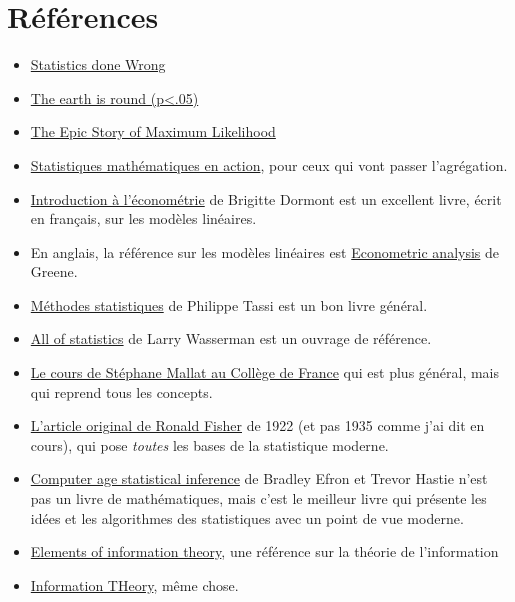 \documentclass[
  10,
  letterpaper,
  DIV=11,
  numbers=noendperiod]{scrreport}
\providecommand{\tightlist}{%
  \setlength{\itemsep}{0pt}\setlength{\parskip}{0pt}}\usepackage{longtable,booktabs,array}
\theoremstyle{plain}
\theoremstyle{definition}
\theoremstyle{plain}
\theoremstyle{definition}
\theoremstyle{definition}
\theoremstyle{plain}
\theoremstyle{remark}
\begin{document}


\hypertarget{ruxe9fuxe9rences}{%
\chapter*{Références}\label{ruxe9fuxe9rences}}


\begin{itemize}
\tightlist
\item
  \href{https://www.statisticsdonewrong.com/}{Statistics done Wrong}
\item
  \href{https://www.sjsu.edu/faculty/gerstman/misc/Cohen1994.pdf}{The
  earth is round (p\textless.05)}
\item
  \href{https://arxiv.org/abs/0804.2996}{The Epic Story of Maximum
  Likelihood}
\item
  \href{https://www.deboecksuperieur.com/ouvrage/9782311007206-statistique-mathematique-en-action}{Statistiques
  mathématiques en action}, pour ceux qui vont passer l'agrégation.
\item
  \href{https://www.eyrolles.com/Entreprise/Livre/introduction-a-l-econometrie-9782707613981/}{Introduction
  à l'économétrie} de Brigitte Dormont est un excellent livre, écrit en
  français, sur les modèles linéaires.
\item
  En anglais, la référence sur les modèles linéaires est
  \href{https://www.pearson.fr/book/?gcoi=27440100285130}{Econometric
  analysis} de Greene.
\item
  \href{https://www.eyrolles.com/Sciences/Livre/methodes-statistiques-9782717848595/}{Méthodes
  statistiques} de Philippe Tassi est un bon livre général.
\item
  \href{https://egrcc.github.io/docs/math/all-of-statistics.pdf}{All of
  statistics} de Larry Wasserman est un ouvrage de référence.
\item
  \href{https://www.college-de-france.fr/fr/agenda/cours/information-et-complexite}{Le
  cours de Stéphane Mallat au Collège de France} qui est plus général,
  mais qui reprend tous les concepts.
\item
  \href{/docs/fisher.pdf}{L'article original de Ronald Fisher} de 1922
  (et pas 1935 comme j'ai dit en cours), qui pose \emph{toutes} les
  bases de la statistique moderne.
\item
  \href{https://hastie.su.domains/CASI_files/PDF/casi.pdf}{Computer age
  statistical inference} de Bradley Efron et Trevor Hastie n'est pas un
  livre de mathématiques, mais c'est le meilleur livre qui présente les
  idées et les algorithmes des statistiques avec un point de vue
  moderne.
\item
  \href{https://onlinelibrary.wiley.com/doi/book/10.1002/047174882X}{Elements
  of information theory}, une référence sur la théorie de l'information
\item
  \href{https://people.lids.mit.edu/yp/homepage/data/itbook-export.pdf}{Information
  THeory}, même chose.
\end{itemize}
\end{document}
